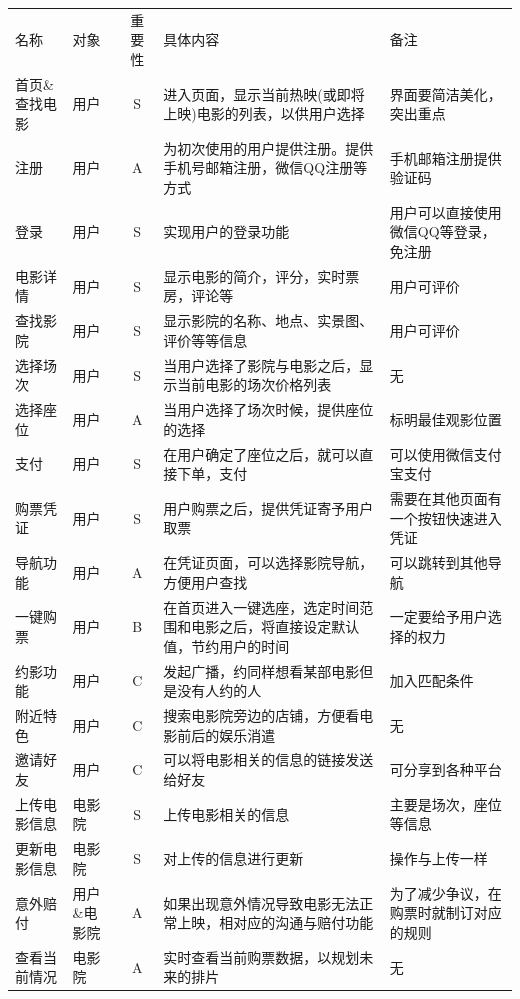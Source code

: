 \documentclass[a4paper]{article}
\begin{document}
  \begin{table}[H]
    \centering
    \renewcommand\arraystretch{1.3}
    \begin{tabular}{llcp{15em}p{7em}}
    名称  & 对象  & 重要性  & 具体内容 & 备注 \\
    首页\&查找电影 & 用户 & S & 进入页面，显示当前热映(或即将上映)电影的列表，以供用户选择& 界面要简洁美化，突出重点 \\
    注册   & 用户 & A & 为初次使用的用户提供注册。提供手机号邮箱注册，微信QQ注册等方式 & 手机邮箱注册提供验证码 \\
    登录   & 用户   & S & 实现用户的登录功能  & 用户可以直接使用微信QQ等登录，免注册 \\
    电影详情   &用户  & S  & 显示电影的简介，评分，实时票房，评论等  & 用户可评价 \\
    查找影院   & 用户 & S & 显示影院的名称、地点、实景图、评价等等信息& 用户可评价 \\
    选择场次  & 用户 & S & 当用户选择了影院与电影之后，显示当前电影的场次价格列表 & 无\\
    选择座位  & 用户 & A & 当用户选择了场次时候，提供座位的选择 & 标明最佳观影位置\\
    支付 & 用户 & S & 在用户确定了座位之后，就可以直接下单，支付 & 可以使用微信支付宝支付\\
    购票凭证 & 用户 & S & 用户购票之后，提供凭证寄予用户取票 & 需要在其他页面有一个按钮快速进入凭证\\
    导航功能 & 用户 & A & 在凭证页面，可以选择影院导航，方便用户查找 & 可以跳转到其他导航\\
    一键购票 & 用户 & B & 在首页进入一键选座，选定时间范围和电影之后，将直接设定默认值，节约用户的时间 & 一定要给予用户选择的权力\\
    约影功能  & 用户 & C & 发起广播，约同样想看某部电影但是没有人约的人 & 加入匹配条件\\
    附近特色  & 用户 & C & 搜索电影院旁边的店铺，方便看电影前后的娱乐消遣 & 无\\
    邀请好友  & 用户 & C & 可以将电影相关的信息的链接发送给好友 & 可分享到各种平台\\
    上传电影信息 & 电影院 & S & 上传电影相关的信息 & 主要是场次，座位等信息\\
    更新电影信息 & 电影院 & S & 对上传的信息进行更新 & 操作与上传一样\\
    意外赔付 & 用户\&电影院 & A & 如果出现意外情况导致电影无法正常上映，相对应的沟通与赔付功能 & 为了减少争议，在购票时就制订对应的规则 \\
    查看当前情况 & 电影院 & A & 实时查看当前购票数据，以规划未来的排片 & 无\\
    \end{tabular}
  \end{table}
\end{document}
